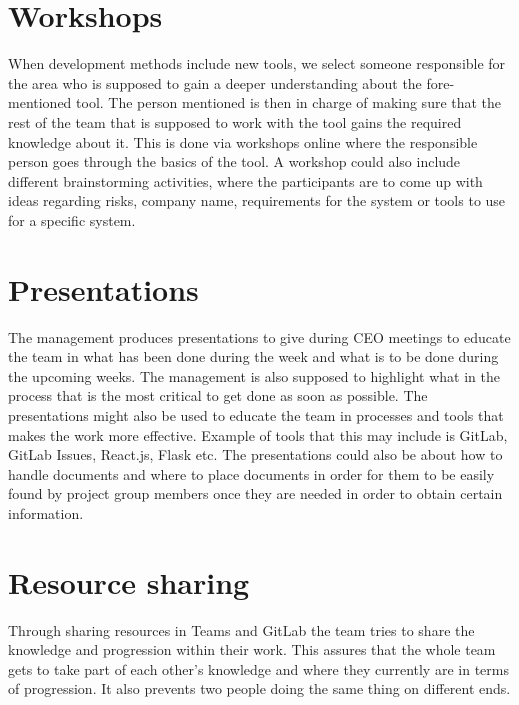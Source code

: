\documentclass[12pt]{article}
\begin{document}
    
    
\clearpage


    \section{Workshops}
  When development methods include new tools, we select someone responsible for the area who is supposed to gain a deeper understanding about the fore-mentioned tool. The person mentioned is then in charge of making sure that the rest of the team that is supposed to work with the tool gains the required knowledge about it. This is done via workshops online where the responsible person goes through the basics of the tool.  A workshop could also include different brainstorming activities, where the participants are to come up with ideas regarding risks, company name, requirements for the system or tools to use for a specific system.
  
    \section{Presentations}
The management produces presentations to give during CEO meetings to educate the team in what has been done during the week and what is to be done during the upcoming weeks. The management is also supposed to highlight what in the process that is the most critical to get done as soon as possible. The presentations might also be used to educate the team in processes and tools that makes the work more effective. Example of tools that this may include is GitLab, GitLab Issues, React.js, Flask etc. The presentations could also be about how to handle documents and where to place documents in order for them to be easily found by project group members once they are needed in order to obtain certain information. 

    \section{Resource sharing}
 Through sharing resources in Teams and GitLab the team tries to share the knowledge and progression within their work. This assures that the whole team gets to take part of each other’s knowledge and where they currently are in terms of progression. It also prevents two people doing the same thing on different ends. 
 
\end{document}

